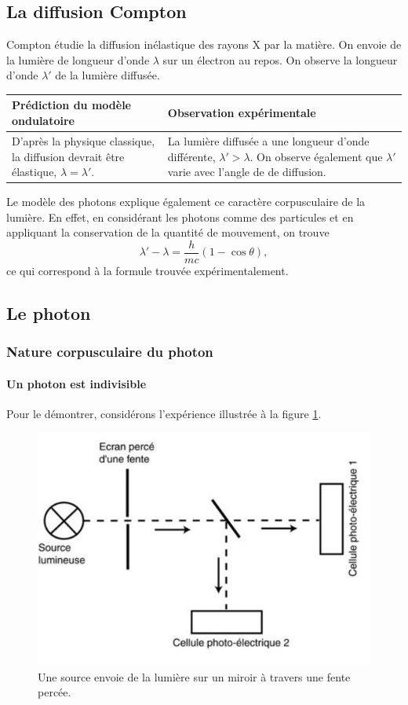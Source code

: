 \subsection{La diffusion Compton}
Compton étudie la diffusion inélastique des rayons X
par la matière. On envoie de la lumière de longueur d'onde
$\lambda$ sur un électron au repos. On observe la longueur
d'onde $\lambda'$ de la lumière diffusée.

\begin{tabular}{p{}|p{}}
	\textbf{Prédiction du modèle ondulatoire} & \textbf{Observation expérimentale} \\
	\hline
	D'après la physique classique, la diffusion devrait être élastique, $\lambda = \lambda'$.
	& La lumière diffusée a une longueur d'onde différente, $\lambda' > \lambda$. On observe
	également que $\lambda'$ varie avec l'angle de de diffusion.
\end{tabular}

Le modèle des photons explique également ce caractère corpusculaire
de la lumière. En effet, en considérant les photons comme des
particules et en appliquant la conservation de la quantité
de mouvement, on trouve
\[ \lambda' -\lambda = \frac{h}{mc}(1-\cos\theta),\]
ce qui correspond à la formule trouvée expérimentalement.

\subsection{Le photon}
\subsubsection{Nature corpusculaire du photon}
\paragraph{Un photon est indivisible}
Pour le démontrer, considérons
l'expérience illustrée à la figure \ref{fig:exp-photon1}.

\begin{figure}[ht!]
	\centering
	\includegraphics[scale=0.5]{img/exp_photon_1.jpg}
	\caption{Une source envoie de la lumière sur un miroir
	à travers une fente percée.}
	\label{fig:exp-photon1}
\end{figure}

